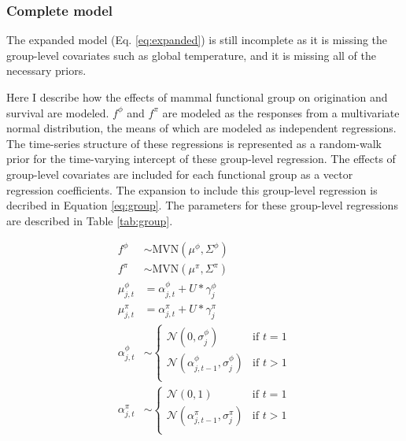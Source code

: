 \documentclass[12pt,letterpaper]{article}
\begin{document}
\subsubsection*{Complete model}
The expanded model (Eq. \ref{eq:expanded}) is still incomplete as it is missing the group-level covariates such as global temperature, and it is missing all of the necessary priors. 

Here I describe how the effects of mammal functional group on origination and survival are modeled. \(f^{\phi}\) and \(f^{\pi}\) are modeled as the responses from a multivariate normal distribution, the means of which are modeled as independent regressions. The time-series structure of these regressions is represented as a random-walk prior for the time-varying intercept of these group-level regression. The effects of group-level covariates are included for each functional group as a vector regression coefficients. The expansion to include this group-level regression is decribed in Equation \ref{eq:group}. The parameters for these group-level regressions are described in Table \ref{tab:group}. 

\begin{equation}
  \begin{aligned}
    f^{\phi} &\sim \text{MVN}(\mu^{\phi}, \Sigma^{\phi}) \\
    f^{\pi} &\sim \text{MVN}(\mu^{\pi}, \Sigma^{\pi}) \\
    \mu^{\phi}_{j, t} &= \alpha^{\phi}_{j, t} + U * \gamma^{\phi}_{j} \\
    \mu^{\pi}_{j, t} &= \alpha^{\pi}_{j, t} + U * \gamma^{\pi}_{j} \\
    \alpha^{\phi}_{j, t} &\sim 
      \begin{cases}
        \mathcal{N}(0, \sigma^{\phi}_{j}) & \text{if } t = 1 \\
        \mathcal{N}(\alpha^{\phi}_{j, t - 1}, \sigma^{\phi}_{j}) & \text{if } t > 1 \\
      \end{cases} \\
    \alpha^{\pi}_{j, t} &\sim 
      \begin{cases}
        \mathcal{N}(0, 1) & \text{if } t = 1 \\
        \mathcal{N}(\alpha^{\pi}_{j, t - 1}, \sigma^{\pi}_{j}) & \text{if } t > 1 \\
      \end{cases} \\
  \end{aligned}
  \label{eq:group}
\end{equation}
\end{document}
